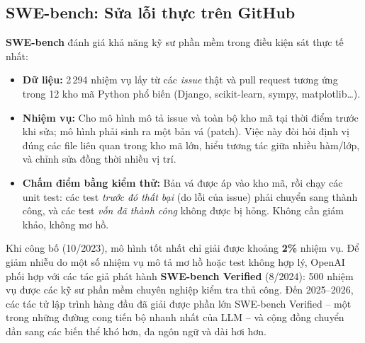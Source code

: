 \subsection{SWE-bench: Sửa lỗi thực trên GitHub}
\label{ssec:swebench}
\textbf{SWE-bench} \cite{jimenez2024swebench} đánh giá khả năng kỹ sư phần mềm trong điều kiện sát thực tế nhất:
\begin{itemize}
	\item \textbf{Dữ liệu:} 2\,294 nhiệm vụ lấy từ các \emph{issue} thật và pull request tương ứng trong 12 kho mã Python phổ biến (Django, scikit-learn, sympy, matplotlib\ldots).
	\item \textbf{Nhiệm vụ:} Cho mô hình mô tả issue và toàn bộ kho mã tại thời điểm trước khi sửa; mô hình phải sinh ra một bản vá (patch). Việc này đòi hỏi định vị đúng các file liên quan trong kho mã lớn, hiểu tương tác giữa nhiều hàm/lớp, và chỉnh sửa đồng thời nhiều vị trí.
	\item \textbf{Chấm điểm bằng kiểm thử:} Bản vá được áp vào kho mã, rồi chạy các unit test: các test \emph{trước đó thất bại} (do lỗi của issue) phải chuyển sang thành công, và các test \emph{vốn đã thành công} không được bị hỏng. Không cần giám khảo, không mơ hồ.
\end{itemize}
Khi công bố (10/2023), mô hình tốt nhất chỉ giải được khoảng \textbf{2\%} nhiệm vụ. Để giảm nhiễu do một số nhiệm vụ mô tả mơ hồ hoặc test không hợp lý, OpenAI phối hợp với các tác giả phát hành \textbf{SWE-bench Verified} \cite{openai2024sweverified} (8/2024): 500 nhiệm vụ được các kỹ sư phần mềm chuyên nghiệp kiểm tra thủ công. Đến 2025--2026, các tác tử lập trình hàng đầu đã giải được phần lớn SWE-bench Verified -- một trong những đường cong tiến bộ nhanh nhất của LLM -- và cộng đồng chuyển dần sang các biến thể khó hơn, đa ngôn ngữ và dài hơi hơn.

\begin{center}
\label{fig:swebench}
\end{center}

